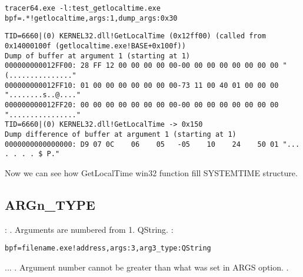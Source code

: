 
\forexample{}

\begin{lstlisting}
tracer64.exe -l:test_getlocaltime.exe bpf=.*!getlocaltime,args:1,dump_args:0x30
\end{lstlisting}

\begin{lstlisting}
TID=6660|(0) KERNEL32.dll!GetLocalTime (0x12ff00) (called from 0x14000100f (getlocaltime.exe!BASE+0x100f))
Dump of buffer at argument 1 (starting at 1)
000000000012FF00: 28 FF 12 00 00 00 00 00-00 00 00 00 00 00 00 00 "(..............."
000000000012FF10: 01 00 00 00 00 00 00 00-73 11 00 40 01 00 00 00 "........s..@...."
000000000012FF20: 00 00 00 00 00 00 00 00-00 00 00 00 00 00 00 00 "................"
TID=6660|(0) KERNEL32.dll!GetLocalTime -> 0x150
Dump difference of buffer at argument 1 (starting at 1)
0000000000000000: D9 07 0C    06    05   -05    10    24    50 01 "... . . . . $ P."
\end{lstlisting}

{Now we can see how GetLocalTime win32 function fill SYSTEMTIME structure.}

\subsection{ARGn\_TYPE}

: . 
{Arguments are numbered from} 1.
 QString.
:

\begin{lstlisting}
bpf=filename.exe!address,args:3,arg3_type:QString
\end{lstlisting}

... .
{Argument number cannot be greater than what was set in ARGS option}.
  .

